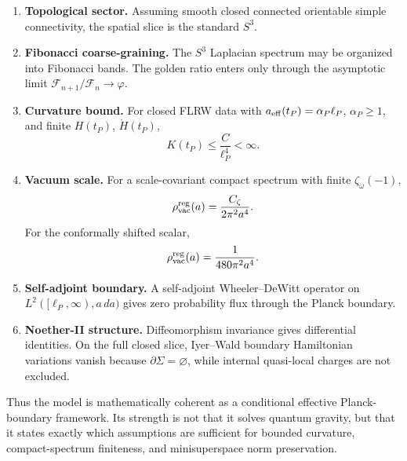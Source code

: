 \documentclass[reprint,aps,prd,letterpaper,superscriptaddress,nofootinbib,longbibliography,floatfix]{revtex4-2}
\theoremstyle{remark}
\newcommand{\Czeta}{C_\zeta}
\begin{document}
\begin{enumerate}
\item \textbf{Topological sector.}
Assuming smooth closed connected orientable simple connectivity, the spatial
slice is the standard \(S^3\).

\item \textbf{Fibonacci coarse-graining.}
The \(S^3\) Laplacian spectrum may be organized into Fibonacci bands.  The
golden ratio enters only through the asymptotic limit
\(\mathcal F_{n+1}/\mathcal F_n\to\varphi\).

\item \textbf{Curvature bound.}
For closed FLRW data with \(a_{\rm eff}(t_P)=\alpha_P\ell_P\), \(\alpha_P\ge1\),
and finite \(H(t_P)\), \(\dot H(t_P)\),
\[
  K(t_P)\le\frac{C}{\ell_P^4}<\infty .
\]

\item \textbf{Vacuum scale.}
For a scale-covariant compact spectrum with finite \(\zeta_\omega(-1)\),
\[
  \rho_{\rm vac}^{\rm reg}(a)=\frac{\Czeta}{2\pi^2a^4}.
\]
For the conformally shifted scalar,
\[
  \rho_{\rm vac}^{\rm reg}(a)=\frac{1}{480\pi^2a^4}.
\]

\item \textbf{Self-adjoint boundary.}
A self-adjoint Wheeler--DeWitt operator on
\(L^2([\ell_P,\infty),a\,da)\) gives zero probability flux through the Planck
boundary.

\item \textbf{Noether-II structure.}
Diffeomorphism invariance gives differential identities.  On the full closed
slice, Iyer--Wald boundary Hamiltonian variations vanish because
\(\partial\Sigma=\varnothing\), while internal quasi-local charges are not
excluded.
\end{enumerate}

Thus the model is mathematically coherent as a conditional effective
Planck-boundary framework.  Its strength is not that it solves quantum gravity,
but that it states exactly which assumptions are sufficient for bounded
curvature, compact-spectrum finiteness, and minisuperspace norm preservation.
\end{document}
